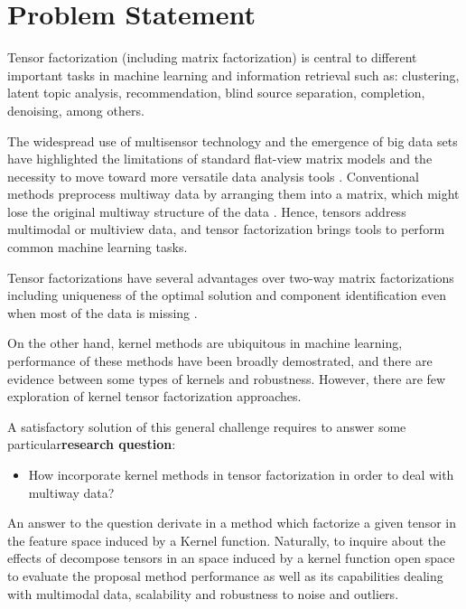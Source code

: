 \documentclass[letterpaper,12pt]{article}
\begin{document}
\section{Problem Statement}


Tensor factorization (including matrix factorization) is central to different important tasks in machine learning and information retrieval such as: clustering, latent topic analysis, recommendation, blind source separation, completion, denoising, among others. 

The widespread use of multisensor technology and the emergence of big data sets have highlighted the limitations of standard flat-view matrix models and the necessity to move toward more versatile data analysis tools \cite{Cichocki2015}. Conventional methods preprocess multiway data by arranging them into a matrix, which might lose the original multiway structure of the data  \cite{Wang2013}. Hence, tensors address multimodal or multiview data, and tensor factorization brings tools to perform common machine learning tasks.%


Tensor factorizations have several advantages over two-way matrix factorizations including uniqueness of the optimal solution and component identification even when most of the data is missing  \cite{Morup2011}.

On the other hand, kernel methods are ubiquitous in machine learning, performance of these methods have been broadly demostrated, and there are evidence between some types of kernels and robustness. However, there are few exploration of kernel tensor factorization approaches.

A satisfactory solution of this general challenge requires to answer some particular\textbf{research question}: 

\begin{itemize}
 \item How incorporate kernel methods in tensor factorization in order to deal with multiway data? %
\end{itemize}

An answer to the question derivate in a method which factorize a given tensor in the feature space induced by a Kernel function. Naturally, to inquire about the effects of decompose tensors in an space induced by a kernel function open space to evaluate the proposal method performance as well as its capabilities dealing with multimodal data, scalability and robustness to noise and outliers.
\end{document}

